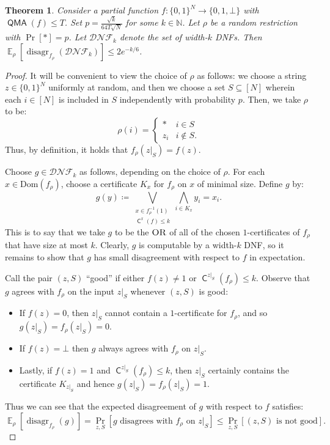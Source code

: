 \documentclass[10pt,a4paper]{article}
\newtheorem{theorem}{Theorem}
\newcommand{\E}{\mathop{\mathbb{E}}}
\newcommand{\Naturals}{\mathbb{N}}
\newcommand{\OR}{\normalfont\textsc{OR}}
\newcommand{\Dom}{\mathrm{Dom}}
\DeclareMathOperator{\disagr}{\mathrm{disagr}}
\DeclareMathOperator{\C}{\mathsf{C}}
\DeclareMathOperator{\QMA}{\mathsf{QMA}}
\begin{document}
\begin{theorem}
\label{thm:qma_random_restriction}
Consider a partial function $f: \{0,1\}^N \to \{0,1,\bot\}$ with $\QMA(f) \le T$. Set $p = \frac{\sqrt{k}}{64T\sqrt{N}}$ for some $k \in \Naturals$. Let $\rho$ be a random restriction with $\Pr[*] = p$. Let $\mathcal{DNF}_k$ denote the set of width-$k$ DNFs. Then $\E_\rho \left[\disagr_{f_\rho}\left(\mathcal{DNF}_k\right)\right] \le 2e^{-k/6}$.
\end{theorem}

\begin{proof}
It will be convenient to view the choice of $\rho$ as follows: we choose a string $z \in \{0,1\}^N$ uniformly at random, and then we choose a set $S \subseteq [N]$ wherein each $i \in [N]$ is included in $S$ independently with probability $p$. Then, we take $\rho$ to be:
\[\rho(i) = \begin{cases} * & i \in S\\ z_i & i \not\in S. \end{cases}\]
Thus, by definition, it holds that $f_\rho(z|_S) = f(z)$.

Choose $g \in \mathcal{DNF}_k$ as follows, depending on the choice of $\rho$. For each $x \in \Dom(f_\rho)$, choose a certificate $K_x$ for $f_\rho$ on $x$ of minimal size. Define $g$ by:
\[g(y) \coloneqq \bigvee_{\substack{x \in f_\rho^{-1}(1) \\ \C^x(f) \le k}} \bigwedge_{i \in K_x} y_i = x_i.\]
This is to say that we take $g$ to be the $\OR$ of all of the chosen $1$-certificates of $f_\rho$ that have size at most $k$. Clearly, $g$ is computable by a width-$k$ DNF, so it remains to show that $g$ has small disagreement with respect to $f$ in expectation.

Call the pair $(z, S)$ ``good'' if either $f(z) \neq 1$ or $\C^{z|_S}(f_\rho) \le k$. Observe that $g$ agrees with $f_\rho$ on the input $z|_S$ whenever $(z, S)$ is good:
\begin{itemize}
\item If $f(z) = 0$, then $z|_S$ cannot contain a $1$-certificate for $f_\rho$, and so $g(z|_S) = f_\rho(z|_S) = 0$.
\item If $f(z) = \bot$ then $g$ always agrees with $f_\rho$ on $z|_S$.
\item Lastly, if $f(z) = 1$ and $\C^{z|_S}(f_\rho) \le k$, then $z|_S$ certainly contains the certificate $K_{z|_S}$ and hence $g(z|_S) = f_\rho(z|_S) = 1$.
\end{itemize}

Thus we can see that the expected disagreement of $g$ with respect to $f$ satisfies:
\[\E_\rho \left[\disagr_{f_\rho}(g) \right] = \Pr_{z,S}\left[g \text{ disagrees with } f_\rho \text{ on } z|_S\right] \le \Pr_{z,S}[(z, S) \text{ is not good}].\]


\end{proof}
\end{document}

